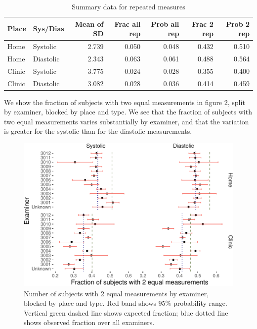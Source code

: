 \documentclass[
]{article}
\begin{document}
\begin{table}[!h]

\caption{\label{tab:sd-summary}Summary data for repeated measures}
\centering
\begin{tabular}[t]{llrrrrr}
\toprule
Place & Sys/Dias & Mean of SD & Frac all rep & Prob all rep & Frac 2 rep & Prob 2 rep\\
\midrule
Home & Systolic & 2.739 & 0.050 & 0.048 & 0.432 & 0.510\\
Home & Diastolic & 2.343 & 0.063 & 0.061 & 0.488 & 0.564\\
Clinic & Systolic & 3.775 & 0.024 & 0.028 & 0.355 & 0.400\\
Clinic & Diastolic & 3.082 & 0.028 & 0.036 & 0.414 & 0.459\\
\bottomrule
\end{tabular}
\end{table}

We show the fraction of subjects with two equal measurements in figure 2, split by examiner, blocked by place and type.
We see that the fraction of subjects with two equal measurements varies substantially by examiner, and that the variation is greater for the systolic than for the diastolic measurements.

\begin{figure}
\centering
\includegraphics{Appendix_files/figure-latex/examinerPlot-1.pdf}
\caption{\label{fig:examinerPlot}Number of subjects with 2 equal measurements by examiner, blocked by place and type. Red band shows 95\% probability range. Vertical green dashed line shows expected fraction; blue dotted line shows observed fraction over all examiners.}
\end{figure}
\end{document}
